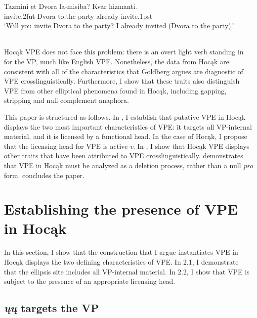\documentclass[output=paper]{LSP/langsci}
\begin{document}
\begin{singlespacing}
\begin{exe}
\ex
\gll Tazmini {et Dvora} la-misiba? Kvar hizmanti.\\
invite.{\textsc 2fut} Dvora to.the-party already invite.{\textsc 1pst}\\
\trans `Will you invite Dvora to the party? I already invited (Dvora to the party).' \\\citep[14]{Goldberg2005}\\
\vspace{-12pt}
\end{exe}
\end{singlespacing}

Hocąk VPE does not face this problem: there is an overt light verb standing in for the VP, much like English VPE. Nonetheless, the data from Hocąk are consistent with all of the characteristics that Goldberg argues are diagnostic of VPE crosslinguistically. Furthermore, I show that these traits also distinguish VPE from other elliptical phenomena found in Hocąk, including gapping, stripping and null complement anaphora. 

This paper is structured as follows. In , I establish that putative VPE in Hocąk displays the two most important characteristics of VPE: it targets all VP-internal material, and it is licensed by a functional head. In the case of Hocąk, I propose that the licensing head for VPE is active \emph{v}. In , I show that Hocąk VPE displays other traits that have been attributed to VPE crosslinguistically.  demonstrates that VPE in Hocąk must be analyzed as a deletion process, rather than a null \emph{pro} form.  concludes the paper.

\section{Establishing the presence of VPE in Hocąk}

In this section, I show that the construction that I argue instantiates VPE in Hocąk displays the two defining characteristics of VPE. In 2.1, I demonstrate that the ellipsis site includes all VP-internal material. In 2.2, I show that VPE is subject to the presence of an appropriate licensing head.

\subsection{\emph{ųų} targets the VP}
\end{document}

